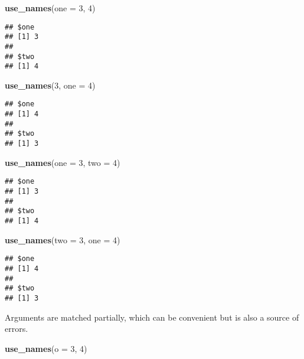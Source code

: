 \documentclass[]{book}
\newenvironment{Shaded}{\begin{snugshade}}{\end{snugshade}}
\newcommand{\DataTypeTok}[1]{\textcolor[rgb]{0.13,0.29,0.53}{#1}}
\newcommand{\DecValTok}[1]{\textcolor[rgb]{0.00,0.00,0.81}{#1}}
\newcommand{\KeywordTok}[1]{\textcolor[rgb]{0.13,0.29,0.53}{\textbf{#1}}}
\newcommand{\NormalTok}[1]{#1}
\begin{document}
\begin{Shaded}
\begin{Highlighting}[]
\KeywordTok{use_names}\NormalTok{(}\DataTypeTok{one =} \DecValTok{3}\NormalTok{, }\DecValTok{4}\NormalTok{)}
\end{Highlighting}
\end{Shaded}

\begin{verbatim}
## $one
## [1] 3
## 
## $two
## [1] 4
\end{verbatim}

\begin{Shaded}
\begin{Highlighting}[]
\KeywordTok{use_names}\NormalTok{(}\DecValTok{3}\NormalTok{, }\DataTypeTok{one =} \DecValTok{4}\NormalTok{)}
\end{Highlighting}
\end{Shaded}

\begin{verbatim}
## $one
## [1] 4
## 
## $two
## [1] 3
\end{verbatim}

\begin{Shaded}
\begin{Highlighting}[]
\KeywordTok{use_names}\NormalTok{(}\DataTypeTok{one =} \DecValTok{3}\NormalTok{, }\DataTypeTok{two =} \DecValTok{4}\NormalTok{)}
\end{Highlighting}
\end{Shaded}

\begin{verbatim}
## $one
## [1] 3
## 
## $two
## [1] 4
\end{verbatim}

\begin{Shaded}
\begin{Highlighting}[]
\KeywordTok{use_names}\NormalTok{(}\DataTypeTok{two =} \DecValTok{3}\NormalTok{, }\DataTypeTok{one =} \DecValTok{4}\NormalTok{)}
\end{Highlighting}
\end{Shaded}

\begin{verbatim}
## $one
## [1] 4
## 
## $two
## [1] 3
\end{verbatim}

Arguments are matched partially, which can be convenient but is also a source of errors.

\begin{Shaded}
\begin{Highlighting}[]
\KeywordTok{use_names}\NormalTok{(}\DataTypeTok{o =} \DecValTok{3}\NormalTok{, }\DecValTok{4}\NormalTok{)}
\end{Highlighting}
\end{Shaded}
\end{document}
